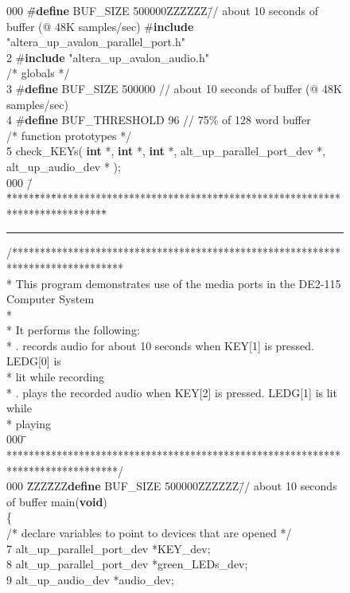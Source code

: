 \documentclass[11pt, twoside, pdftex]{article}
\begin{document}
\begin{figure}[h!]
\begin{center}
\begin{minipage}[t]{12.5 cm}
\begin{tabbing}
000 \=\#{\bf define} BUF\_SIZE 500000ZZZZZZ\=// about 10 seconds of buffer (@ 48K samples/sec) \>\#{\bf include} "altera\_up\_avalon\_parallel\_port.h"\\
2 \>\#{\bf include} "altera\_up\_avalon\_audio.h"\\
 
\>/* globals */\\
3 \>\#{\bf define} BUF\_SIZE 500000	\>// about 10 seconds of buffer (@ 48K samples/sec)\\
4 \>\#{\bf define} BUF\_THRESHOLD 96	\>// 75\% of 128 word buffer \\
 
\>/* function prototypes */\\
5  check\_KEYs( {\bf int} *, {\bf int} *, {\bf int} *, alt\_up\_parallel\_port\_dev *, alt\_up\_audio\_dev * );\\
000 \=/\=*****\=***\=******************************\=****************************************\=\kill
\rule{6.0in}{0in} 
\>/********************************************************************************\\
\>\>* This program demonstrates use of the media ports in the DE2-115 Computer System\\
\>\>*\\
\>\>* It performs the following: \\
\>\>*  	. \>records audio for about 10 seconds when KEY[1] is pressed. LEDG[0] is\\
\>\>*  	\>\>   lit while recording\\
\>\>* 	. \>plays the recorded audio when KEY[2] is pressed. LEDG[1] is lit while \\
\>\>* 	\>\>   playing\\
000 \=\=\kill\\
\>\>********************************************************************************/\\
000 \=ZZZ\=ZZZ\={\bf define} BUF\_SIZE 500000ZZZZZZ\=// about 10 seconds of buffer   main({\bf void})\\
\>\{\\
\>\>/* declare variables to point to devices that are opened */\\
7	\>\>alt\_up\_parallel\_port\_dev *KEY\_dev;\\
8	\>\>alt\_up\_parallel\_port\_dev *green\_LEDs\_dev;\\
9	\>\>alt\_up\_audio\_dev *audio\_dev;\\
 

\end{tabbing}
\end{minipage}
\end{center}
\end{figure}
\end{document}
